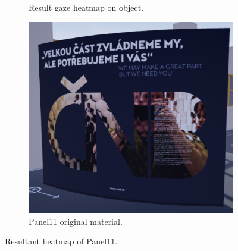 \begin{figure}[!ht]
\begin{subfigure}[b]{0.335\textwidth}
        \caption{Result gaze heatmap on object.}
        \label{fig:panel11-heatmap}
    \end{subfigure}
    \hfill
    \begin{subfigure}[b]{0.33\textwidth}
        \centering
        \includegraphics[width=\textwidth]{img/data/Panel11/resultant/original.png}
        \caption{Panel11 original material.}
    \end{subfigure}
    \caption{Resultant heatmap of Panel11.}
    \label{fig:Panel11-resultant-heatmaps.}
\end{figure}


